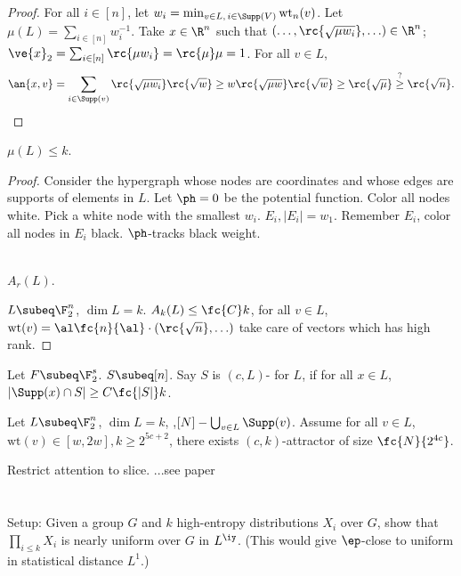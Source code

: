 \begin{proof}
For all $i\in [n]$, let $w_i=\min_{v\in L,\,i\in \Supp(V)} \text{wt}_n(v)$. Let $\mu(L)=\sum_{i\in [n]}w_i^{-1}$. Take $x\in \R^n$ such that $(\ldots, \rc{\sqrt{\mu w_i}},\ldots)\in \R^n$; $\ve{x}_2=\sum_{i\in [n]}\rc{\mu w_i}=\rc{\mu}\mu=1$.
For all $v\in L$, 
\[\an{x,v}=\sum_{i\in \Supp(v)} \rc{\sqrt{\mu w_i}}\rc{\sqrt w} \ge w\rc{\sqrt{\mu w}}\rc{\sqrt w}\ge \rc{\sqrt\mu}\stackrel ?{\ge} \rc{\sqrt n}.\] 
\end{proof}
\begin{lem}
$\mu(L)\le k$. 
\end{lem}
\begin{proof}
Consider the hypergraph whose nodes are coordinates and whose edges are supports of elements in $L$. 
Let $\ph=0$ be the potential function. Color all nodes white. Pick a white node with the smallest $w_i$. $E_i,|E_i|=w_1$. Remember $E_i$, color all nodes in $E_i$ black. $\ph$-tracks black weight.
\\\

$A_r(L)$.

$L\subeq \F_2^n$, $\dim L=k$. $A_k(L)\le \fc{C}k$, for all $v\in L$, $\text{wt}(v)=\al \fc{n}{\al} \cdot (\rc{\sqrt{n}},\ldots)$
take care of vectors which has high rank. 
\end{proof}
\begin{df}
Let $F\subeq \F_2^s$. $S\subeq[n]$. Say $S$ is $(c,L)$- for $L$, if for all $x\in L$, $|\Supp (x)\cap S|\ge C\fc{|S|}k$.
\end{df}
\begin{lem}Let $L\subeq \F_2^n$, %
$\dim L=k$, ,$[N]-\bigcup_{v\in L}\Supp(v)$. Assume for all $v\in L$, $\text{wt}(v)\in [w,2w], k\ge 2^{5c+2}$, there exists $(c,k)$-attractor of size $\fc{N}{2^{4c}}$.
\end{lem}
Restrict attention to slice.
...see paper

\section{}
Setup: Given a group $G$ and $k$ high-entropy distributions $X_i$ over $G$, show that $\prod_{i\le k}X_i$ is nearly uniform over $G$ in $L^{\iy}$.
(This would give $\ep$-close to uniform in statistical distance $L^1$.)

